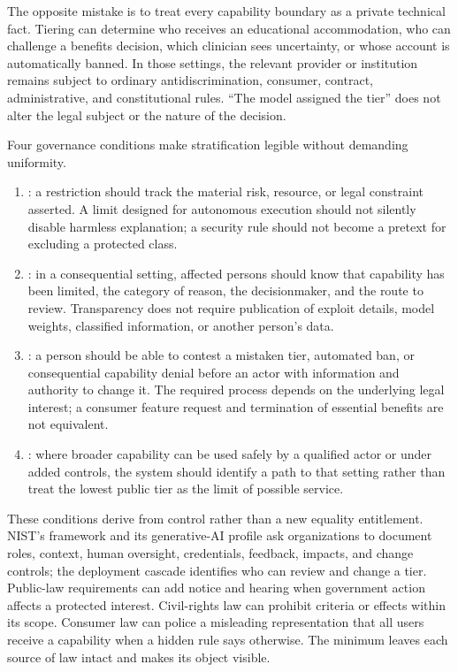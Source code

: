 The opposite mistake is to treat every capability boundary as a private technical fact. Tiering can determine who receives an educational accommodation, who can challenge a benefits decision, which clinician sees uncertainty, or whose account is automatically banned. In those settings, the relevant provider or institution remains subject to ordinary antidiscrimination, consumer, contract, administrative, and constitutional rules. ``The model assigned the tier'' does not alter the legal subject or the nature of the decision.

Four governance conditions make stratification legible without demanding uniformity.

\begin{enumerate}[leftmargin=2.2em]
\item {}: a restriction should track the material risk, resource, or legal constraint asserted. A limit designed for autonomous execution should not silently disable harmless explanation; a security rule should not become a pretext for excluding a protected class.
\item {}: in a consequential setting, affected persons should know that capability has been limited, the category of reason, the decisionmaker, and the route to review. Transparency does not require publication of exploit details, model weights, classified information, or another person's data.
\item {}: a person should be able to contest a mistaken tier, automated ban, or consequential capability denial before an actor with information and authority to change it. The required process depends on the underlying legal interest; a consumer feature request and termination of essential benefits are not equivalent.
\item {}: where broader capability can be used safely by a qualified actor or under added controls, the system should identify a path to that setting rather than treat the lowest public tier as the limit of possible service.
\end{enumerate}

These conditions derive from control rather than a new equality entitlement. NIST's framework and its generative-AI profile ask organizations to document roles, context, human oversight, credentials, feedback, impacts, and change controls; the deployment cascade identifies who can review and change a tier. Public-law requirements can add notice and hearing when government action affects a protected interest. Civil-rights law can prohibit criteria or effects within its scope. Consumer law can police a misleading representation that all users receive a capability when a hidden rule says otherwise. The minimum leaves each source of law intact and makes its object visible.

